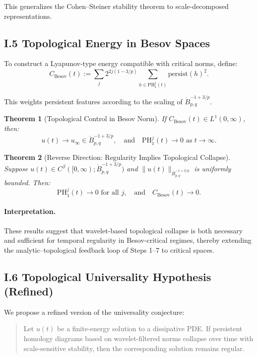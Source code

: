 \documentclass[11pt]{article}
\newtheorem{theorem}{Theorem}[section]
\theoremstyle{definition}
\begin{document}
This generalizes the Cohen--Steiner stability theorem to scale-decomposed representations.

\subsection*{I.5 Topological Energy in Besov Spaces}

To construct a Lyapunov-type energy compatible with critical norms, define:
\[ C_{\text{Besov}}(t) := \sum_{j} 2^{2j(1 - 3/p)} \sum_{h \in \mathrm{PH}_1^j(t)} \mathrm{persist}(h)^2. \]

This weights persistent features according to the scaling of $\dot{B}^{-1+3/p}_{p,q}$.

\begin{theorem}[Topological Control in Besov Norm]
If $C_{\text{Besov}}(t) \in L^1(0,\infty)$, then:
\[ u(t) \to u_\infty \in \dot{B}^{-1+3/p}_{p,q}, \quad \text{and} \quad \mathrm{PH}_1^j(t) \to 0 \text{ as } t \to \infty. \]
\end{theorem}

\begin{theorem}[Reverse Direction: Regularity Implies Topological Collapse]
Suppose $u(t) \in C^\beta([0,\infty); \dot{B}^{-1+3/p}_{p,q})$ and $\|u(t)\|_{\dot{B}^{-1+3/p}_{p,q}}$ is uniformly bounded. Then:
\[ \mathrm{PH}_1^j(t) \to 0 \text{ for all } j, \quad \text{and} \quad C_{\text{Besov}}(t) \to 0. \]
\end{theorem}

\paragraph{Interpretation.} These results suggest that wavelet-based topological collapse is both necessary and sufficient for temporal regularity in Besov-critical regimes, thereby extending the analytic–topological feedback loop of Steps 1–7 to critical spaces.

\subsection*{I.6 Topological Universality Hypothesis (Refined)}

We propose a refined version of the universality conjecture:

\begin{quote}
Let $u(t)$ be a finite-energy solution to a dissipative PDE. If persistent homology diagrams based on wavelet-filtered norms collapse over time with scale-sensitive stability, then the corresponding solution remains regular.
\end{quote}
\end{document}
